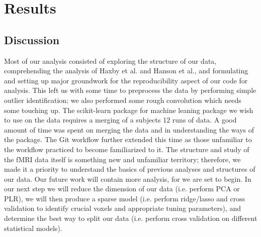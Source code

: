 \documentclass[11pt]{article}
\begin{document}
\subsection{}



\section{Results}

\subsection{Discussion}

Most of our analysis consisted of exploring the structure of our data, 
comprehending the analysis of Haxby et al. and Hanson et al., and formulating 
and setting up major groundwork for the reproducibility aspect of our code for 
analysis. This left us with some time to preprocess the data by performing 
simple outlier identification; we also performed some rough convolution which 
needs some touching up. The scikit-learn package for machine leaning package we 
wish to use on the data requires a merging of a subjects 12 runs of data.  A 
good amount of time was spent on merging the data and in understanding the ways 
of the package.  The Git workflow further extended this time as those 
unfamiliar to the workflow practiced to become familiarized to it.  The 
structure and study of the fMRI data itself is something new and unfamiliar 
territory; therefore, we made it a priority to understand the basics of 
previous analyses and structures of our data.  Our future work will contain 
more analysis, for we are set to begin. In our next step we will reduce the 
dimension of our data (i.e. perform PCA or PLR), we will then produce a sparse 
model (i.e. perform ridge/lasso and cross validation to identify crucial voxels 
and appropriate tuning parameters), and determine the best way to split our 
data (i.e. perform cross validation on different statistical models). 



\end{document}
